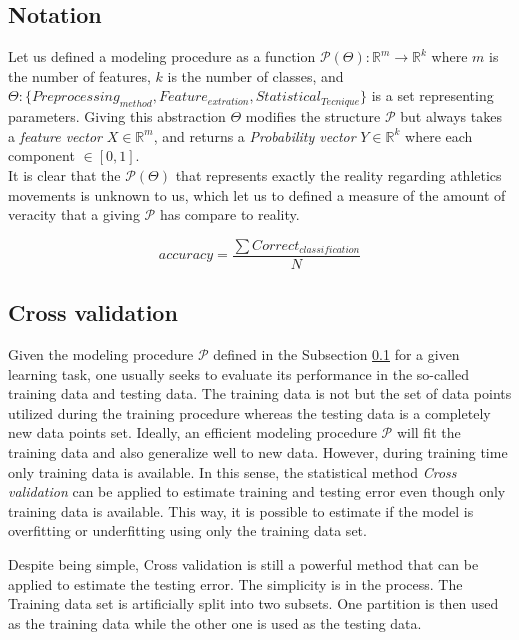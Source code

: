\subsection{Notation} \label{notation}
Let us defined a modeling procedure as  a function $\mathcal{P}(\Theta): \mathbb{R}^{m} \longrightarrow \mathbb{R}^{k}$ where $m$ is the number of features, $k$ is the number of classes, and $\Theta : \{Preprocessing_{method}, Feature_{extration}, Statistical_{Tecnique} \}$ is a set representing parameters. Giving this abstraction $\Theta$ modifies the structure  $\mathcal{P}$ but always takes a \textit{feature vector} $X \in  \mathbb{R}^{m}$, and returns a \textit{Probability vector} $Y \in  \mathbb{R}^{k}$ where each component $\in  [0,1]$.\\

It is clear that the $\mathcal{P}(\Theta)$ that represents exactly the reality regarding athletics movements is unknown to us, which let us to defined a measure of the amount of veracity that a giving $\mathcal{P}$ has compare to reality.

\begin{equation}
accuracy=  \frac{\sum Correct_{classification}}{N}
\end{equation}

\subsection{Cross validation}

Given the modeling procedure $\mathcal{P}$ defined in the Subsection \ref{notation} 
for a given learning task, one usually seeks to evaluate its performance in the 
so-called training data and testing data. The training data is not but the set of 
data points utilized during the training procedure whereas the testing data is a 
completely new data points set. Ideally, an efficient modeling procedure 
$\mathcal{P}$ will fit the training data and also generalize well to new data. 
However, during training time only training data is available. In this sense, the 
statistical method \textit{Cross validation} can be applied to estimate training 
and testing error even though only training data is available. This way, it is 
possible to estimate if the model is overfitting or underfitting using only the 
training data set.

Despite being simple, Cross validation is still a powerful method that can be 
applied to estimate the testing error. The simplicity is in the process. The 
Training data set is artificially split into two subsets. One partition is then 
used as the training data while the other one is used as the testing data.

